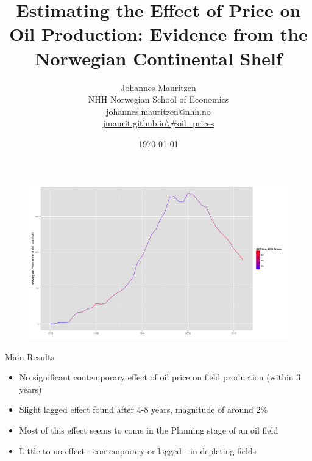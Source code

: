\documentclass{beamer}
\title[oil]{Estimating the Effect of Price on Oil Production: Evidence from the Norwegian Continental Shelf}
\author[Mauritzen]{Johannes Mauritzen \\ NHH Norwegian School of Economics \\
johannes.mauritzen@nhh.no \\
\url{jmaurit.github.io\\#oil\_prices}}
\institute[NHH]{
}
\date{\today}
\begin{document}
\begin{frame}[plain]
  \titlepage
\end{frame}

\begin{frame}
	\begin{figure}
		\includegraphics[width=1\textwidth]{figures/oil_decline_print.png}
		\label{oil_decline}
	\end{figure}
\end{frame}

\begin{frame}[plain]
	Main Results
	\begin{itemize}
		\item No significant contemporary effect of oil price on field production (within 3 years)
		\item Slight lagged effect found after 4-8 years, magnitude of around 2\%
		\item Most of this effect seems to come in the Planning stage of an oil field
		\item Little to no effect - contemporary or lagged - in depleting fields
	\end{itemize}
\end{frame}
\end{document}
